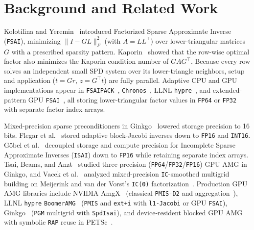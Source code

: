 \documentclass[10pt]{article}
\begin{document}
\section{Background and Related Work}\label{sec:background}
Kolotilina and Yeremin~\cite{kolotilina1993fsai} introduced Factorized Sparse Approximate Inverse (\texttt{FSAI}), minimizing $\|I - G L\|_F^2$ (with $A = L L^\top$) over lower-triangular matrices $G$ with a prescribed sparsity pattern. Kaporin~\cite{kaporin1994new} showed that the row-wise optimal factor also minimizes the Kaporin condition number of $G A G^\top$. Because every row solves an independent small SPD system over its lower-triangle neighbors, setup and application ($t = G r$, $z = G^\top t$) are fully parallel. Adaptive CPU and GPU implementations appear in \texttt{FSAIPACK}~\cite{janna2015fsaipack}, \texttt{Chronos}~\cite{isotton2021chronos}, LLNL \texttt{hypre}~\cite{falgout2002hypre,yang2002boomeramg}, and extended-pattern GPU \texttt{FSAI}~\cite{laut2024gfsai}, all storing lower-triangular factor values in \texttt{FP64} or \texttt{FP32} with separate factor index arrays.

Mixed-precision sparse preconditioners in Ginkgo~\cite{anzt2022ginkgo} lowered storage precision to 16 bits. Flegar et al.~\cite{flegar2021adaptive} stored adaptive block-Jacobi inverses down to \texttt{FP16} and \texttt{INT16}. G\"obel et al.~\cite{gobel2021mixed} decoupled storage and compute precision for Incomplete Sparse Approximate Inverses (\texttt{ISAI}) down to \texttt{FP16} while retaining separate index arrays. Tsai, Beams, and Anzt~\cite{tsai2023three} studied three-precision (\texttt{FP64}/\texttt{FP32}/\texttt{FP16}) GPU AMG in Ginkgo, and Vacek et al.~\cite{vacek2025mixed} analyzed mixed-precision \texttt{IC}-smoothed multigrid building on Meijerink and van der Vorst's \texttt{IC(0)} factorization~\cite{meijerink1977ic}. Production GPU AMG libraries include NVIDIA AmgX~\cite{naumov2015amgx} (classical \texttt{PMIS-D2} and aggregation~\cite{notay2010agmg}), LLNL \texttt{hypre} \texttt{BoomerAMG}~\cite{falgout2002hypre,yang2002boomeramg} (\texttt{PMIS} and \texttt{ext+i} with \texttt{l1-Jacobi} or GPU \texttt{FSAI}), Ginkgo~\cite{anzt2022ginkgo} (\texttt{PGM} multigrid with \texttt{SpdIsai}), and device-resident blocked GPU AMG with symbolic \texttt{RAP} reuse in PETSc~\cite{adams2026blocked,adams2026galerkin}.
\end{document}
